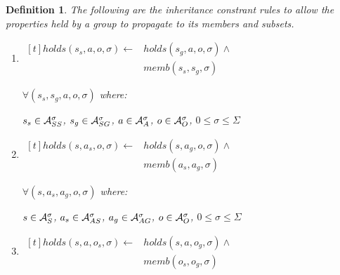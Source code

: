 \documentclass[10pt, twocolumn]{article}
\newtheorem{definition}{Definition}
\begin{document}
          \begin{definition}
            The following are the inheritance constrant rules to allow the
            properties held by a group to propagate to its members and
            subsets.

            \begin{enumerate}
              \item
                \begin{math}
                  \begin{aligned}[t]
                    holds(s_{s}, a, o, \sigma) \leftarrow &
                    holds(s_{g}, a, o, \sigma) \land \\
                    & memb(s_{s}, s_{g}, \sigma)
                  \end{aligned}
                \end{math}

                $\forall (s_{s}, s_{g}, a, o, \sigma)$ where:

                $s_{s} \in {\cal A}^{\sigma}_{SS}$,
                $s_{g} \in {\cal A}^{\sigma}_{SG}$,
                $a \in {\cal A}^{\sigma}_{A}$,
                $o \in {\cal A}^{\sigma}_{O}$,
                $0 \leq \sigma \leq \Sigma$
              \item
                \begin{math}
                  \begin{aligned}[t]
                    holds(s, a_{s}, o, \sigma) \leftarrow &
                    holds(s, a_{g}, o, \sigma) \land \\
                    & memb(a_{s}, a_{g}, \sigma)
                  \end{aligned}
                \end{math}

                $\forall (s, a_{s}, a_{g}, o, \sigma)$ where:

                $s \in {\cal A}^{\sigma}_{S}$,
                $a_{s} \in {\cal A}^{\sigma}_{AS}$,
                $a_{g} \in {\cal A}^{\sigma}_{AG}$,
                $o \in {\cal A}^{\sigma}_{O}$,
                $0 \leq \sigma \leq \Sigma$
              \item
                \begin{math}
                  \begin{aligned}[t]
                    holds(s, a, o_{s}, \sigma) \leftarrow &
                    holds(s, a, o_{g}, \sigma) \land \\
                    & memb(o_{s}, o_{g}, \sigma)
                  \end{aligned}
                \end{math}


\end{enumerate}
\end{definition}
\end{document}
